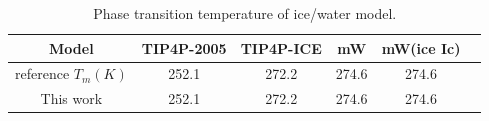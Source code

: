 \documentclass[aps,prl,twocolumn,superscriptaddress]{revtex4-1}
\begin{document}
\begin{table}
\caption{Phase transition temperature of ice/water model.}
\centering{}%
\begin{tabular}{cccccc}
\hline
{Model} & {TIP4P-2005} & {  TIP4P-ICE}  & {mW}  & {mW(ice Ic)}\tabularnewline
\hline

{reference  $T_m (K)$} & {252.1} & {272.2}  & {274.6}  & {274.6} \tabularnewline
{This work} & { 252.1} & {272.2}  & {274.6}  & {274.6}\tabularnewline

\hline
\end{tabular}
\label{table:PTtemp}
\end{table}




\end{document}
